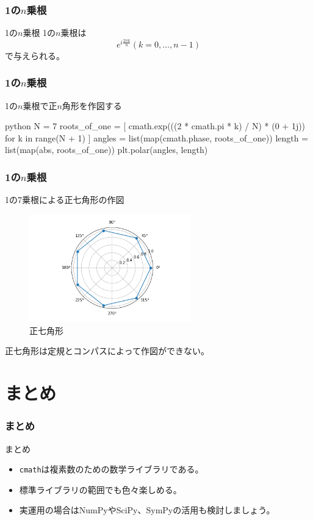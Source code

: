 \documentclass[dvipdfmx,11pt,notheorems]{beamer}
\theoremstyle{definition}
\begin{document}
\begin{frame}[fragile]\frametitle{1の$n$乗根}

\begin{block}{1の$n$乗根}
1の$n$乗根は
\begin{equation*}
e^{i \frac{2\pi k}{n}}(k=0, \dots , n-1)
\end{equation*}
で与えられる。
\end{block}

\end{frame}

\begin{frame}[fragile]\frametitle{1の$n$乗根}
\begin{exampleblock}{1の$n$乗根で正$n$角形を作図する}
\begin{pygments}{python}
N = 7
roots_of_one = [
    cmath.exp(((2 * cmath.pi * k) / N) * (0 + 1j)) 
    for k in range(N + 1)
]
angles = list(map(cmath.phase, roots_of_one))
length = list(map(abs, roots_of_one))
plt.polar(angles, length)
\end{pygments}
\end{exampleblock}

\end{frame}

\begin{frame}[fragile]\frametitle{1の$n$乗根}

\begin{block}{1の7乗根による正七角形の作図}
\begin{figure}
  \centering
  \includegraphics[width=7cm]{heptagon.png}
  \caption{正七角形}
\end{figure}
正七角形は定規とコンパスによって作図ができない。
\end{block}
\end{frame}

\section{まとめ}

\begin{frame}[fragile]\frametitle{まとめ}
\begin{block}{まとめ}
\begin{itemize}
\item \texttt{cmath}は複素数のための数学ライブラリである。
\item 標準ライブラリの範囲でも色々楽しめる。
\item 実運用の場合はNumPyやSciPy、SymPyの活用も検討しましょう。
\end{itemize}
\end{block}
\end{frame}
\end{document}
